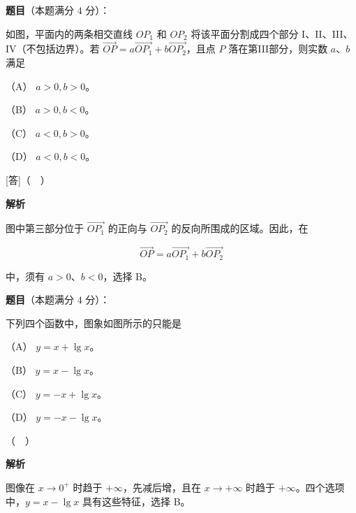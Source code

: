 \begin{answer}

\textbf{题目}（本题满分 $4$ 分）：

如图，平面内的两条相交直线 $OP_1$ 和 $OP_2$ 将该平面分割成四个部分 I、II、III、IV（不包括边界）。若 $\overrightarrow{OP}=a\overrightarrow{OP_1}+b\overrightarrow{OP_2}$，且点 $P$ 落在第III部分，则实数 $a$、$b$ 满足
\nopagebreak[4]
\begin{center}\end{center}
\nopagebreak[4]
（A） $a>0,b>0$。

（B） $a>0,b<0$。

（C） $a<0,b>0$。

（D） $a<0,b<0$。

[答]（　）

\textbf{解析}

图中第三部分位于 $\overrightarrow{OP_1}$ 的正向与 $\overrightarrow{OP_2}$ 的反向所围成的区域。因此，在

\nopagebreak[4]
\[
\overrightarrow{OP}=a\overrightarrow{OP_1}+b\overrightarrow{OP_2}
\]

中，须有 $a>0$、$b<0$，选择 B。


\end{answer}
\begin{answer}

\textbf{题目}（本题满分 $4$ 分）：

下列四个函数中，图象如图所示的只能是

（A） $y=x+\lg x$。

（B） $y=x-\lg x$。

（C） $y=-x+\lg x$。

（D） $y=-x-\lg x$。
\nopagebreak[4]
\begin{center}\end{center}
\nopagebreak[4]
[答]（　）

\textbf{解析}

图像在 $x\to0^+$ 时趋于 $+\infty$，先减后增，且在 $x\to+\infty$ 时趋于 $+\infty$。四个选项中，$y=x-\lg x$ 具有这些特征，选择 B。


\end{answer}
